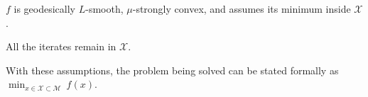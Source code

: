 \begin{assumption} \label{assumption:3}
	$f$ is geodesically $L$-smooth, $\mu$-strongly convex, and assumes its minimum inside $\mathcal{X}$.
\end{assumption} \vspace{-18pt}
\begin{assumption} \label{assumption:4}
	All the iterates remain in $\mathcal{X}$.
\end{assumption}
With these assumptions, the problem being solved can be stated formally as $\min_{x\in\mathcal{X}\subset\mathcal{M}} ~ f(x)$.



